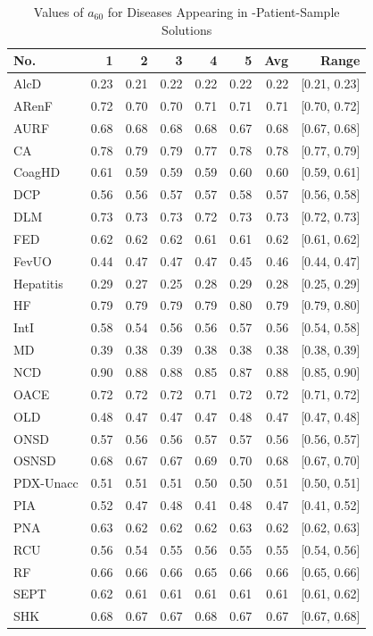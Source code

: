\begin{table}[htbp]
\centering
\footnotesize 
\begin{tabular}{l|rrrrrrr}
\toprule
No. & 1 & 2 & 3 & 4 & 5 & Avg & Range \\
\midrule
AlcD      & 0.23 & 0.21 & 0.22 & 0.22 & 0.22 & 0.22 & [0.21, 0.23] \\
ARenF     & 0.72 & 0.70 & 0.70 & 0.71 & 0.71 & 0.71 & [0.70, 0.72] \\
AURF      & 0.68 & 0.68 & 0.68 & 0.68 & 0.67 & 0.68 & [0.67, 0.68] \\
CA        & 0.78 & 0.79 & 0.79 & 0.77 & 0.78 & 0.78 & [0.77, 0.79] \\
CoagHD    & 0.61 & 0.59 & 0.59 & 0.59 & 0.60 & 0.60 & [0.59, 0.61] \\
DCP       & 0.56 & 0.56 & 0.57 & 0.57 & 0.58 & 0.57 & [0.56, 0.58] \\
DLM       & 0.73 & 0.73 & 0.73 & 0.72 & 0.73 & 0.73 & [0.72, 0.73] \\
FED       & 0.62 & 0.62 & 0.62 & 0.61 & 0.61 & 0.62 & [0.61, 0.62] \\
FevUO     & 0.44 & 0.47 & 0.47 & 0.47 & 0.45 & 0.46 & [0.44, 0.47] \\
Hepatitis & 0.29 & 0.27 & 0.25 & 0.28 & 0.29 & 0.28 & [0.25, 0.29] \\
HF        & 0.79 & 0.79 & 0.79 & 0.79 & 0.80 & 0.79 & [0.79, 0.80] \\
IntI      & 0.58 & 0.54 & 0.56 & 0.56 & 0.57 & 0.56 & [0.54, 0.58] \\
MD        & 0.39 & 0.38 & 0.39 & 0.38 & 0.38 & 0.38 & [0.38, 0.39] \\
NCD       & 0.90 & 0.88 & 0.88 & 0.85 & 0.87 & 0.88 & [0.85, 0.90] \\
OACE      & 0.72 & 0.72 & 0.72 & 0.71 & 0.72 & 0.72 & [0.71, 0.72] \\
OLD       & 0.48 & 0.47 & 0.47 & 0.47 & 0.48 & 0.47 & [0.47, 0.48] \\
ONSD      & 0.57 & 0.56 & 0.56 & 0.57 & 0.57 & 0.56 & [0.56, 0.57] \\
OSNSD     & 0.68 & 0.67 & 0.67 & 0.69 & 0.70 & 0.68 & [0.67, 0.70] \\
PDX-Unacc & 0.51 & 0.51 & 0.51 & 0.50 & 0.50 & 0.51 & [0.50, 0.51] \\
PIA       & 0.52 & 0.47 & 0.48 & 0.41 & 0.48 & 0.47 & [0.41, 0.52] \\
PNA       & 0.63 & 0.62 & 0.62 & 0.62 & 0.63 & 0.62 & [0.62, 0.63] \\
RCU       & 0.56 & 0.54 & 0.55 & 0.56 & 0.55 & 0.55 & [0.54, 0.56] \\
RF        & 0.66 & 0.66 & 0.66 & 0.65 & 0.66 & 0.66 & [0.65, 0.66] \\
SEPT      & 0.62 & 0.61 & 0.61 & 0.61 & 0.61 & 0.61 & [0.61, 0.62] \\
SHK       & 0.68 & 0.67 & 0.67 & 0.68 & 0.67 & 0.67 & [0.67, 0.68] \\
\bottomrule
\end{tabular}
\caption{Values of $a_{60}$ for Diseases Appearing in -Patient-Sample Solutions}
\label{tab.a60_25k}
\end{table}

